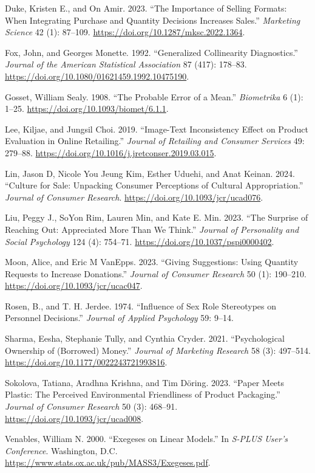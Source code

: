 \documentclass[
  11pt,
  letterpaper,
]{scrbook}
\newlength{\cslhangindent}
\newenvironment{CSLReferences}[2] %
 {\begin{list}{}{%
  \setlength{\itemindent}{0pt}
  \setlength{\leftmargin}{0pt}
  \setlength{\parsep}{0pt}
  \ifodd #1
   \setlength{\leftmargin}{\cslhangindent}
   \setlength{\itemindent}{-1\cslhangindent}
  \fi
  \setlength{\itemsep}{#2\baselineskip}}}
 {\end{list}}
\theoremstyle{definition}
\theoremstyle{plain}
\theoremstyle{definition}
\theoremstyle{plain}
\theoremstyle{remark}
\begin{document}
\begin{CSLReferences}{1}{0}
Duke, Kristen E., and On Amir. 2023. {``The Importance of Selling
Formats: When Integrating Purchase and Quantity Decisions Increases
Sales.''} \emph{Marketing Science} 42 (1): 87--109.
\url{https://doi.org/10.1287/mksc.2022.1364}.

Fox, John, and Georges Monette. 1992. {``Generalized Collinearity
Diagnostics.''} \emph{Journal of the American Statistical Association}
87 (417): 178--83. \url{https://doi.org/10.1080/01621459.1992.10475190}.

Gosset, William Sealy. 1908. {``The Probable Error of a Mean.''}
\emph{Biometrika} 6 (1): 1--25.
\url{https://doi.org/10.1093/biomet/6.1.1}.

Lee, Kiljae, and Jungsil Choi. 2019. {``Image-Text Inconsistency Effect
on Product Evaluation in Online Retailing.''} \emph{Journal of Retailing
and Consumer Services} 49: 279--88.
\url{https://doi.org/10.1016/j.jretconser.2019.03.015}.

Lin, Jason D, Nicole You Jeung Kim, Esther Uduehi, and Anat Keinan.
2024. {``Culture for Sale: Unpacking Consumer Perceptions of Cultural
Appropriation.''} \emph{Journal of Consumer Research}.
\url{https://doi.org/10.1093/jcr/ucad076}.

Liu, Peggy J., SoYon Rim, Lauren Min, and Kate E. Min. 2023. {``The
Surprise of Reaching Out: Appreciated More Than We Think.''}
\emph{Journal of Personality and Social Psychology} 124 (4): 754--71.
\url{https://doi.org/10.1037/pspi0000402}.

Moon, Alice, and Eric M VanEpps. 2023. {``Giving Suggestions: Using
Quantity Requests to Increase Donations.''} \emph{Journal of Consumer
Research} 50 (1): 190--210. \url{https://doi.org/10.1093/jcr/ucac047}.

Rosen, B., and T. H. Jerdee. 1974. {``Influence of Sex Role Stereotypes
on Personnel Decisions.''} \emph{Journal of Applied Psychology} 59:
9--14.

Sharma, Eesha, Stephanie Tully, and Cynthia Cryder. 2021.
{``Psychological Ownership of (Borrowed) Money.''} \emph{Journal of
Marketing Research} 58 (3): 497--514.
\url{https://doi.org/10.1177/0022243721993816}.

Sokolova, Tatiana, Aradhna Krishna, and Tim Döring. 2023. {``Paper Meets
Plastic: The Perceived Environmental Friendliness of Product
Packaging.''} \emph{Journal of Consumer Research} 50 (3): 468--91.
\url{https://doi.org/10.1093/jcr/ucad008}.

Venables, William N. 2000. {``Exegeses on Linear Models.''} In
\emph{S-PLUS User's Conference}. Washington, D.C.
\url{https://www.stats.ox.ac.uk/pub/MASS3/Exegeses.pdf}.

\end{CSLReferences}


\backmatter
\end{document}
